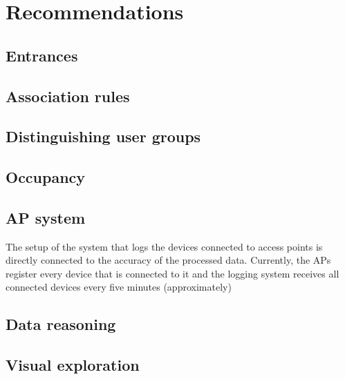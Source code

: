 \chapter{Recommendations}
\section{Entrances}

\section{Association rules} 

\section{Distinguishing user groups}

\section{Occupancy}

\section{AP system}
The setup of the system that logs the devices connected to access points is directly connected to the accuracy of the processed data. Currently, the APs register every device that is connected to it and the logging system receives all connected devices every five minutes (approximately)

\section{Data reasoning}

\section{Visual exploration}
